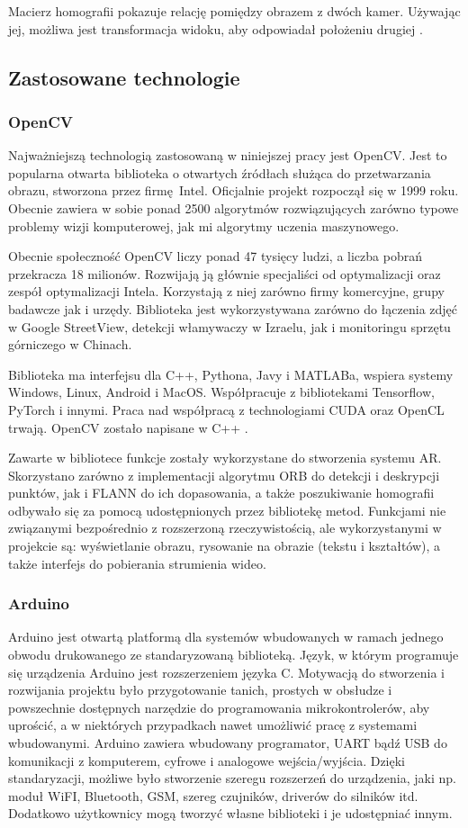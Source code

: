 \documentclass[12pt,twoside,polish]{article}
\begin{document}
Macierz homografii pokazuje relację pomiędzy obrazem z dwóch kamer. Używając jej, możliwa jest transformacja widoku, aby odpowiadał położeniu drugiej \cite[s.660]{learnopencv}.


\subsection{Zastosowane technologie}
\subsubsection{OpenCV}
Najważniejszą technologią zastosowaną w niniejszej pracy jest OpenCV. Jest to popularna otwarta biblioteka o otwartych źródłach służąca do przetwarzania obrazu, stworzona przez firmę Intel. Oficjalnie projekt rozpoczął się w 1999 roku. Obecnie zawiera w sobie  ponad 2500 algorytmów rozwiązujących zarówno typowe problemy wizji komputerowej, jak mi algorytmy uczenia maszynowego.

Obecnie społeczność OpenCV liczy ponad 47 tysięcy ludzi, a liczba pobrań przekracza 18 milionów. Rozwijają ją głównie specjaliści od optymalizacji oraz zespół optymalizacji Intela.  Korzystają z niej zarówno firmy komercyjne, grupy badawcze jak i urzędy. Biblioteka jest wykorzystywana zarówno do łączenia zdjęć w Google StreetView, detekcji włamywaczy w Izraelu, jak i monitoringu sprzętu górniczego w Chinach.

Biblioteka ma interfejsu dla C++, Pythona, Javy i MATLABa, wspiera systemy Windows, Linux, Android i MacOS. Współpracuje z bibliotekami Tensorflow, PyTorch i innymi. Praca nad współpracą z technologiami CUDA oraz OpenCL trwają. OpenCV zostało napisane w C++ \cite{opencv}.

Zawarte w bibliotece funkcje zostały wykorzystane do stworzenia systemu AR. Skorzystano zarówno z implementacji algorytmu ORB do detekcji i deskrypcji punktów, jak i FLANN do ich dopasowania, a także poszukiwanie homografii odbywało się za pomocą udostępnionych przez bibliotekę metod. Funkcjami nie związanymi bezpośrednio z rozszerzoną rzeczywistością, ale wykorzystanymi w projekcie są: wyświetlanie obrazu, rysowanie na obrazie (tekstu i kształtów), a także interfejs do pobierania strumienia wideo.

\subsubsection{Arduino}
Arduino jest otwartą platformą dla systemów wbudowanych w ramach jednego obwodu drukowanego ze standaryzowaną biblioteką. Język, w którym programuje się urządzenia Arduino jest rozszerzeniem języka C. Motywacją do stworzenia i rozwijania projektu było przygotowanie tanich, prostych w obsłudze i powszechnie dostępnych narzędzie do programowania mikrokontrolerów, aby uprościć, a w niektórych przypadkach nawet umożliwić pracę z systemami wbudowanymi. Arduino zawiera wbudowany programator, UART bądź USB do komunikacji z komputerem, cyfrowe i analogowe wejścia/wyjścia. Dzięki standaryzacji, możliwe było stworzenie szeregu rozszerzeń do urządzenia, jaki np. moduł WiFI, Bluetooth, GSM, szereg czujników, driverów do silników itd. Dodatkowo użytkownicy mogą tworzyć własne biblioteki i je udostępniać innym.
\end{document}
